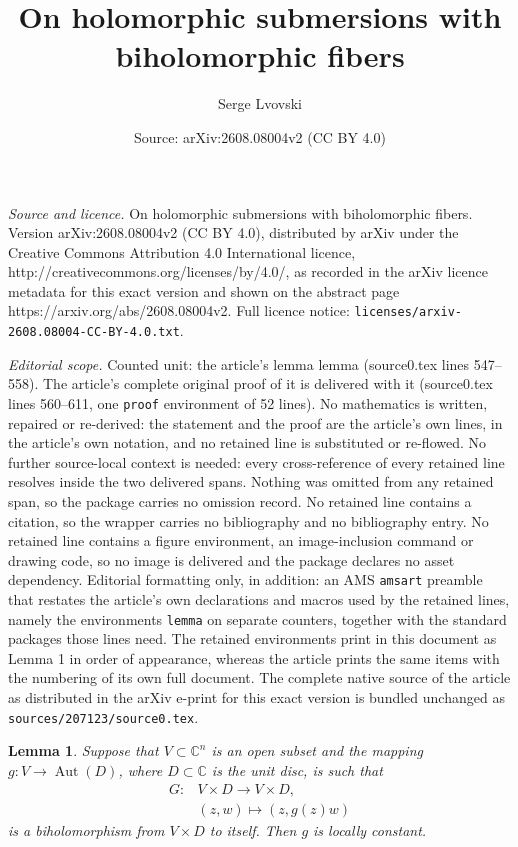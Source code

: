 \documentclass[10pt,a4paper]{amsart}
\title{On holomorphic submersions with biholomorphic fibers}
\author{Serge Lvovski}
\date{Source: arXiv:2608.08004v2 (CC BY 4.0)}
\newtheorem{lemma}{Lemma}
\DeclareMathOperator{\Aut}{Aut}
\newcommand*{\C}{{\mathbb C}}
\begin{document}
\maketitle

\noindent\emph{Source and licence.} On holomorphic submersions with biholomorphic fibers. Version arXiv:2608.08004v2 (CC BY 4.0), distributed by arXiv under the Creative Commons Attribution 4.0 International licence, http://creativecommons.org/licenses/by/4.0/, as recorded in the arXiv licence metadata for this exact version and shown on the abstract page https://arxiv.org/abs/2608.08004v2. Full licence notice: \texttt{licenses/arxiv-2608.08004-CC-BY-4.0.txt}.\par\smallskip

\noindent\textit{Editorial scope.} Counted unit: the article's lemma lemma (source0.tex lines 547--558). The article's complete original proof of it is delivered with it (source0.tex lines 560--611, one \texttt{proof} environment of 52 lines). No mathematics is written, repaired or re-derived: the statement and the proof are the article's own lines, in the article's own notation, and no retained line is substituted or re-flowed.  No further source-local context is needed: every cross-reference of every retained line resolves inside the two delivered spans.  Nothing was omitted from any retained span, so the package carries no omission record.  No retained line contains a citation, so the wrapper carries no bibliography and no bibliography entry.  No retained line contains a figure environment, an image-inclusion command or drawing code, so no image is delivered and the package declares no asset dependency.  Editorial formatting only, in addition: an AMS \texttt{amsart} preamble that restates the article's own declarations and macros used by the retained lines, namely the environments \texttt{lemma} on separate counters, together with the standard packages those lines need.  The retained environments print in this document as Lemma 1 in order of appearance, whereas the article prints the same items with the numbering of its own full document.  The complete native source of the article as distributed in the arXiv e-print for this exact version is bundled unchanged as \texttt{sources/207123/source0.tex}.
\begin{lemma}\label{lemma}
Suppose that $V\subset\C^n$ is an open subset and the mapping $g\colon
V\to\Aut(D)$, where $D\subset\C$ is the unit disc, is such that 
\begin{equation}\label{eq:G}
\begin{aligned}
  G\colon &V\times D\to V\times D,\\
  &(z,w)\mapsto(z,g(z)w)  
\end{aligned}
\end{equation}
is a biholomorphism from $V\times D$ to
itself. Then $g$ is locally constant.
\end{lemma}
\end{document}
